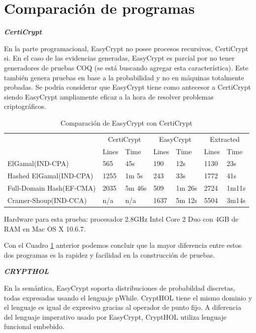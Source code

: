 \documentclass[runningheads,a4paper]{llncs}
\begin{document}
\section{Comparación de programas}
\centerline{\textbf{{\emph{CertiCrypt}}}}
En la parte programacional, EasyCrypt no posee procesos recursivos, CertiCrypt\cite{link3} si. En el caso de las evidencias generadas, EasyCrypt es parcial por no tener generadores de pruebas COQ (se está buscando agregar esta característica). Este también genera pruebas en base a la probabilidad y no en máquinas totalmente probadas. Se podria considerar que EasyCrypt tiene como antecesor a CertiCrypt siendo EasyCrypt ampliamente eficaz a la hora de resolver problemas criptográficos.

\begin{table}
  \caption{Comparación de EasyCrypt con CertiCrypt}
  \label{tab:simple1}
  \centering
  \begin{tabular}{ |p{3.5cm}|p{1cm}|p{1.5cm}|p{1cm}|p{1.5cm}|p{1cm}|p{1.5cm}|  }
 \hline
 & \multicolumn{2}{|c|}{CertiCrypt} & \multicolumn{2}{|c|}{EasyCrypt} & \multicolumn{2}{|c|}{Extracted} \\\cline{2-7}

 &Lines&Time&Lines&Time&Lines&Time\\\cline{2-7}
 \hline
 ElGamal(IND-CPA) & 565 & 45s & 190 & 12s & 1130 & 23s\\
 Hashed ElGamal(IND-CPA) & 1255  & 1m 5s & 243  & 33s & 1772 & 41s\\
 Full-Domain Hash(EF-CMA) & 2035 & 5m 46s&  509 & 1m 26s & 2724 & 1m11s\\
 Cramer-Shoup(IND-CCA) & n/a & n/a & 1637 & 5m 12s & 5504 & 3m14s\\
 \hline
\end{tabular}
\end{table}

Hardware para esta prueba: procesador 2.8GHz Intel Core 2 Duo con 4GB de RAM en Mac OS X 10.6.7.\cite{article3}

Con el Cuadro \ref{tab:simple1} anterior podemos concluir que la mayor diferencia entre estos dos programas es la rapidez y facilidad en la construcción de pruebas.

\centerline{\textbf{{\emph{CRYPTHOL}}}}

En la semántica, EasyCrypt soporta distribuciones de probabildad discretas, todas expresadas usando el lenguaje pWhile. CryptHOL\cite{link4} tiene el mismo dominio y el lenguaje es igual de expresivo gracias al operador de punto fijo. A diferencia del lenguaje imperativo usado por EasyCrypt, CryptHOL utiliza lenguaje funcional embebido.
\end{document}
